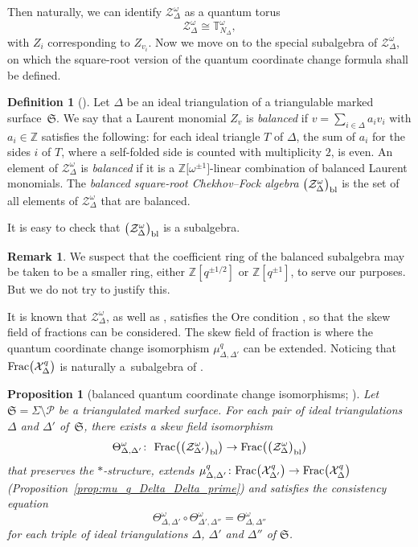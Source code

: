 \documentclass[10pt,a4paper]{amsart}
\numberwithin{equation}{section}
\newtheorem{Proposition}[Theorem]{Proposition}
\theoremstyle{definition}
\newtheorem{Definition}[Theorem]{Definition}
\newtheorem{Remark}[Theorem]{Remark}
\begin{document}
Then naturally, we can identify $\mathcal{Z}^\omega_\Delta$ as a quantum torus
\[
\mathcal{Z}^\omega_\Delta \cong \mathbb{T}^\omega_{N_\Delta},
\]
with $Z_i$ corresponding to $Z_{v_i}$.
Now we move on to the special subalgebra of $\mathcal{Z}^\omega_\Delta$, on which the square-root version of the quantum coordinate change formula shall be defined.
\begin{Definition}[\cite{BW, Hiatt}]\label{def:balanced_algebra}
Let $\Delta$ be an ideal triangulation of a triangulable marked surface~$\mathfrak{S}$. We say that a Laurent monomial $Z_v$ is {\em balanced} if $v = \sum_{i \in \Delta} a_i v_i$ with $a_i \in \mathbb{Z}$ satisfies the following: for each ideal triangle $T$ of $\Delta$, the sum of $a_i$ for the sides $i$ of $T$, where a self-folded side is counted with multiplicity $2$, is even.
An element of $\mathcal{Z}^\omega_\Delta$ is {\em balanced} if it is a $\mathbb{Z}\bigl[\omega^{\pm 1}\bigr]$-linear combination of balanced Laurent monomials.
The {\em balanced square-root Chekhov--Fock algebra} $\bigl(\mathcal{Z}^\omega_\Delta\bigr)_{\rm bl}$ is the set of all elements of $\mathcal{Z}^\omega_\Delta$ that are balanced.
\end{Definition}
It is easy to check that $\bigl(\mathcal{Z}^\omega_\Delta\bigr)_{\rm bl}$ is a subalgebra.
\begin{Remark}
We suspect that the coefficient ring of the balanced subalgebra  may be taken to be a smaller ring, either $\mathbb{Z}[q^{\pm 1/2}]$ or $\mathbb{Z}[q^{\pm 1}]$, to serve our purposes. But we do not try to justify this.
\end{Remark}
It is known that $\mathcal{Z}^\omega_\Delta$, as well as , satisfies the Ore condition \cite{Cohn, KLS}, so that the skew field of fractions can be considered. The skew field of fraction  is where the quantum coordinate change isomorphism $\mu^q_{\Delta,\Delta'}$ can be extended. Noticing that ${\rm Frac}\bigl(\mathcal{X}^q_\Delta\bigr)$ is naturally a~subalgebra of .
\begin{Proposition}[balanced quantum coordinate change isomorphisms; \cite{BW, Hiatt,KLS,Son}]
\label{prop:Theta}
Let $\mathfrak{S}= \Sigma\setminus\mathcal{P}$ be a triangulated marked surface. For each pair of ideal triangulations $\Delta$ and $\Delta'$ of~$\mathfrak{S}$, there exists a skew field isomorphism
\[
\Theta^\omega_{\Delta,\Delta'} \colon \ {\rm Frac}\bigl(\bigl(\mathcal{Z}^\omega_{\Delta'}\bigr)_{\rm bl}\bigr) \to {\rm Frac}\bigl(\bigl(\mathcal{Z}^\omega_\Delta\bigr)_{\rm bl}\bigr)
\]
that preserves the $*$-structure, extends $\mu^q_{\Delta,\Delta'} \colon {\rm Frac}\bigl(\mathcal{X}^q_{\Delta'}\bigr) \to {\rm Frac}\bigl(\mathcal{X}^q_\Delta\bigr)$ (Proposition~\ref{prop:mu_q_Delta_Delta_prime}) and satisfies the consistency equation
\[
\Theta^\omega_{\Delta,\Delta'} \circ \Theta^\omega_{\Delta',\Delta''} = \Theta^\omega_{\Delta,\Delta''}
\]
for each triple of ideal triangulations $\Delta$, $\Delta'$ and $\Delta''$ of $\mathfrak{S}$.
\end{Proposition}
\end{document}
